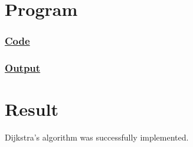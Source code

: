 \section{Program}

\subsubsection{\underline{Code}}



\clearpage

\subsubsection{\underline{Output}}



\vfill

\section{Result}
{\Large\color{white}
Dijkstra's algorithm was successfully implemented.
\color{black}}

\clearpage